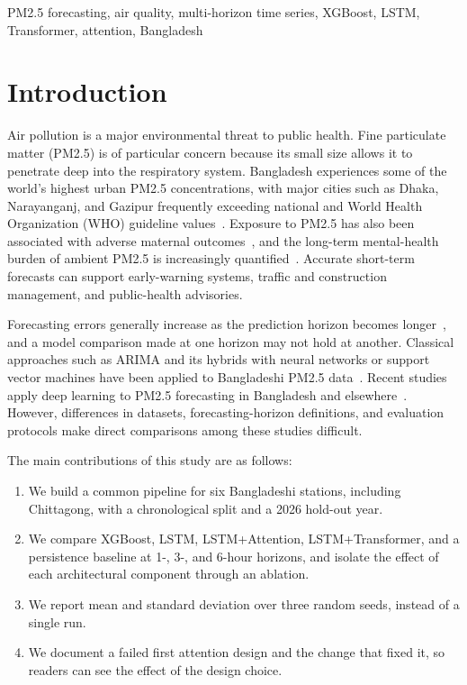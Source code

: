 \documentclass[conference]{IEEEtran}
\begin{document}
\begin{IEEEkeywords}
PM2.5 forecasting, air quality, multi-horizon time series, XGBoost, LSTM, Transformer, attention, Bangladesh
\end{IEEEkeywords}

\section{Introduction}
Air pollution is a major environmental threat to public health. Fine particulate matter (PM2.5) is of particular concern because its small size allows it to penetrate deep into the respiratory system. Bangladesh experiences some of the world's highest urban PM2.5 concentrations, with major cities such as Dhaka, Narayanganj, and Gazipur frequently exceeding national and World Health Organization (WHO) guideline values~\cite{shahriar2021}. Exposure to PM2.5 has also been associated with adverse maternal outcomes~\cite{nayeem2026}, and the long-term mental-health burden of ambient PM2.5 is increasingly quantified~\cite{siddik2026}. Accurate short-term forecasts can support early-warning systems, traffic and construction management, and public-health advisories.

Forecasting errors generally increase as the prediction horizon becomes longer~\cite{zeng2026}, and a model comparison made at one horizon may not hold at another. Classical approaches such as ARIMA and its hybrids with neural networks or support vector machines have been applied to Bangladeshi PM2.5 data~\cite{shahriar2021}. Recent studies apply deep learning to PM2.5 forecasting in Bangladesh and elsewhere~\cite{ahmed2026,islam2025,nobin2026,lisun2023}. However, differences in datasets, forecasting-horizon definitions, and evaluation protocols make direct comparisons among these studies difficult.

The main contributions of this study are as follows:
\begin{enumerate}
    \item We build a common pipeline for six Bangladeshi stations, including Chittagong, with a chronological split and a 2026 hold-out year.
    \item We compare XGBoost, LSTM, LSTM+Attention, LSTM+Transformer, and a persistence baseline at 1-, 3-, and 6-hour horizons, and isolate the effect of each architectural component through an ablation.
    \item We report mean and standard deviation over three random seeds, instead of a single run.
    \item We document a failed first attention design and the change that fixed it, so readers can see the effect of the design choice.
\end{enumerate}
\end{document}
